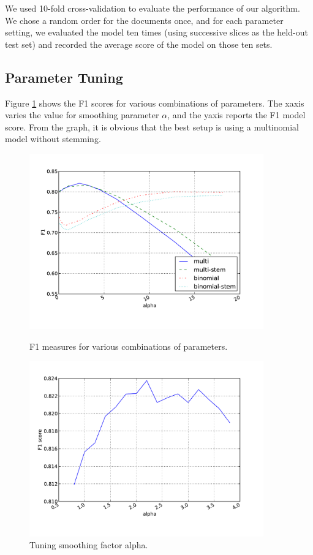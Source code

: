 \documentclass{article}
\begin{document}
We used 10-fold cross-validation to evaluate the performance of our algorithm.  We chose a random order for the documents once, and for each parameter setting, we evaluated the model ten times (using successive slices as the held-out test set) and recorded the average score of the model on those ten sets.


\subsection{Parameter Tuning}
\label{sec:alpha}

Figure \ref{all-combo} shows the F1 scores for various combinations of parameters. The x\-axis varies the value for smoothing parameter \(\alpha\), and the y\-axis reports the F1 model score. From the graph, it is obvious that the best setup is using a multinomial model without stemming.

\begin{figure}
  \centering
  \caption{F1 measures for various combinations of parameters.}
  \includegraphics[width=0.9\textwidth]{graphs/all-combo.pdf}
  \label{all-combo}
\end{figure}

\begin{figure}
  \centering
  \caption{Tuning smoothing factor alpha.}
  \includegraphics[width=0.9\textwidth]{graphs/alpha.pdf}
\end{figure}
\end{document}
